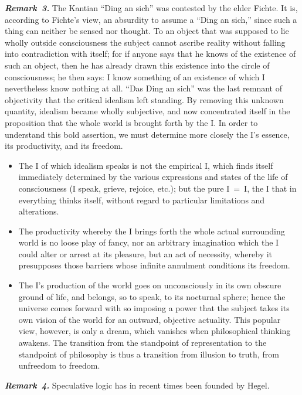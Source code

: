 \documentclass[12pt]{book}
\newcommand{\anm}[1]{\emph{\textbf{Remark~#1.}}}
\begin{document}
\anm{3} The Kantian ``Ding an sich'' was contested by the elder Fichte. It
is, according to Fichte's view, an absurdity to assume a ``Ding an sich,''
since such a thing can neither be sensed nor thought. To an object that was
supposed to lie wholly outside consciousness the subject cannot ascribe
reality without falling into contradiction with itself; for if anyone says
that he knows of the existence of such an object, then he has already drawn
this existence into the circle of consciousness; he then says: I know
something of an existence of which I nevertheless know nothing at all.
``Das Ding an sich'' was the last remnant of objectivity that the critical
idealism left standing. By removing this unknown quantity, idealism became
wholly subjective, and now concentrated itself in the proposition that the
whole world is brought forth by the I. In order to understand this bold
assertion, we must determine more closely the I's essence, its productivity,
and its freedom.

\begin{itemize}
\item[a)] The I of which idealism speaks is not the empirical I, which finds
  itself immediately determined by the various expressions and states of the
  life of consciousness (I speak, grieve, rejoice, etc.); but the pure
  I~=~I, the I that in everything thinks itself, without regard to
  particular limitations and alterations.
\item[b)] The productivity whereby the I brings forth the whole actual
  surrounding world is no loose play of fancy, nor an arbitrary imagination
  which the I could alter or arrest at its pleasure, but an act of
  necessity, whereby it presupposes those barriers whose infinite annulment
  conditions its freedom.
\item[c)] The I's production of the world goes on unconsciously in its own
  obscure ground of life, and belongs, so to speak, to its nocturnal sphere;
  hence the universe comes forward with so imposing a power that the subject
  takes its own vision of the world for an outward, objective actuality.
  This popular view, however, is only a dream, which vanishes when
  philosophical thinking awakens. The transition from the standpoint of
  representation to the standpoint of philosophy is thus a transition from
  illusion to truth, from unfreedom to freedom.
\end{itemize}

\anm{4} Speculative logic has in recent times been founded by Hegel.
\end{document}
